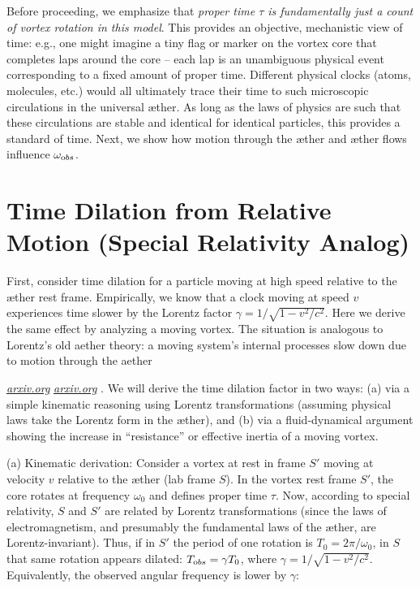 \documentclass[aps,preprint,superscriptaddress]{revtex4}
\begin{document}
Before proceeding, we emphasize that \textit{proper time $\tau$ is fundamentally just a count of vortex rotation in this model}. This provides an objective, mechanistic view of time: e.g., one might imagine a tiny flag or marker on the vortex core that completes laps around the core – each lap is an unambiguous physical event corresponding to a fixed amount of proper time. Different physical clocks (atoms, molecules, etc.) would all ultimately trace their time to such microscopic circulations in the universal æther. As long as the laws of physics are such that these circulations are stable and identical for identical particles, this provides a standard of time. Next, we show how motion through the æther and æther flows influence $\omega_{\textrm obs}$.

\section*{Time Dilation from Relative Motion (Special Relativity Analog)}

First, consider time dilation for a particle moving at high speed relative to the æther rest frame. Empirically, we know that a clock moving at speed $v$ experiences time slower by the Lorentz factor $\gamma = 1/\sqrt{1-v^2/c^2}$. Here we derive the same effect by analyzing a moving vortex. The situation is analogous to Lorentz’s old aether theory: a moving system’s internal processes slow down due to motion through the aether

\href{https://arxiv.org/pdf/physics/0611077#:~:text=relativity%20theory%2C%20but%20obviously%20its,light%20in%20all%20inertial%20frames}{\textit{arxiv.org}}
\href{https://arxiv.org/pdf/physics/0611077#:~:text=We%20should%20note%20that%2C%20when,a%20state%20of%20absolute%20rest}{\textit{arxiv.org}}
. We will derive the time dilation factor in two ways: (a) via a simple kinematic reasoning using Lorentz transformations (assuming physical laws take the Lorentz form in the æther), and (b) via a fluid-dynamical argument showing the increase in “resistance” or effective inertia of a moving vortex.

(a) Kinematic derivation: Consider a vortex at rest in frame $S'$ moving at velocity $v$ relative to the æther (lab frame $S$). In the vortex rest frame $S'$, the core rotates at frequency $\omega_0$ and defines proper time $\tau$. Now, according to special relativity, $S$ and $S'$ are related by Lorentz transformations (since the laws of electromagnetism, and presumably the fundamental laws of the æther, are Lorentz-invariant). Thus, if in $S'$ the period of one rotation is $T_0 = 2\pi/\omega_0$, in $S$ that same rotation appears dilated: $T_{\textrm obs} = \gamma T_0$, where $\gamma = 1/\sqrt{1-v^2/c^2}$. Equivalently, the observed angular frequency is lower by $\gamma$:
\end{document}
